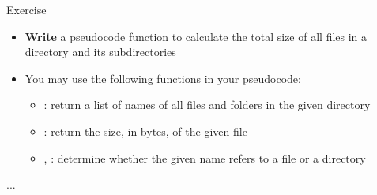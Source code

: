 \begin{frame}{Exercise}
	\begin{itemize}
		\item \textbf{Write} a pseudocode function to calculate the total size of all files in a directory and its subdirectories
		\item You may use the following functions in your pseudocode:
			\begin{itemize}
				\item {}: return a list of names of all files and folders in the given directory
				\item {}: return the size, in bytes, of the given file
				\item {}, : determine whether the given name refers to a file or a directory
			\end{itemize}
	\end{itemize}
	\begin{algorithmic}
			\State ... 
		\EndProcedure
	\end{algorithmic}
\end{frame}

